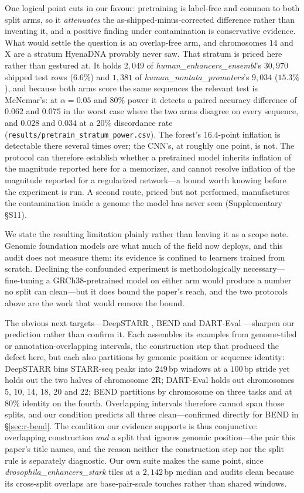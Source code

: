 \documentclass[webpdf,modern,large,namedate]{oup-authoring-template}%
\begin{document}
One logical point cuts in our favour: pretraining is label-free and common to both split arms, so it \emph{attenuates} the as-shipped-minus-corrected difference rather than inventing it, and a positive finding under contamination is conservative evidence. What would settle the question is an overlap-free arm, and chromosomes $14$ and X are a stratum HyenaDNA provably never saw. That stratum is priced here rather than gestured at. It holds $2{,}049$ of \textit{human\_enhancers\_ensembl}'s $30{,}970$ shipped test rows ($6.6\%$) and $1{,}381$ of \textit{human\_nontata\_promoters}'s $9{,}034$ ($15.3\%$), and because both arms score the same sequences the relevant test is McNemar's: at $\alpha=0.05$ and $80\%$ power it detects a paired accuracy difference of $0.062$ and $0.075$ in the worst case where the two arms disagree on every sequence, and $0.028$ and $0.034$ at a $20\%$ discordance rate (\texttt{results/pretrain\_stratum\_power.csv}). The forest's $16.4$-point inflation is detectable there several times over; the CNN's, at roughly one point, is not. The protocol can therefore establish whether a pretrained model inherits inflation of the magnitude reported here for a memorizer, and cannot resolve inflation of the magnitude reported for a regularized network---a bound worth knowing before the experiment is run. A second route, priced but not performed, manufactures the contamination inside a genome the model has never seen (Supplementary \S S11).

We state the resulting limitation plainly rather than leaving it as a scope note. Genomic foundation models are what much of the field now deploys, and this audit does not measure them: its evidence is confined to learners trained from scratch. Declining the confounded experiment is methodologically necessary---fine-tuning a GRCh38-pretrained model on either arm would produce a number no split can clean---but it does bound the paper's reach, and the two protocols above are the work that would remove the bound.

The obvious next targets---DeepSTARR \citep{dealmeida2022deepstarr}, BEND \citep{marin2024bend} and DART-Eval \citep{patel2024darteval}---sharpen our prediction rather than confirm it. Each assembles its examples from genome-tiled or annotation-overlapping intervals, the construction step that produced the defect here, but each also partitions by genomic position or sequence identity: DeepSTARR bins STARR-seq peaks into $249$\,bp windows at a $100$\,bp stride yet holds out the two halves of chromosome 2R; DART-Eval holds out chromosomes 5, 10, 14, 18, 20 and 22; BEND partitions by chromosome on three tasks and at $80\%$ identity on the fourth. Overlapping intervals therefore cannot span those splits, and our condition predicts all three clean---confirmed directly for BEND in \S\ref{sec:r-bend}. The condition our evidence supports is thus conjunctive: overlapping construction \emph{and} a split that ignores genomic position---the pair this paper's title names, and the reason neither the construction step nor the split rule is separately diagnostic. Our own suite makes the same point, since \textit{drosophila\_enhancers\_stark} tiles at a $2{,}142$\,bp median and audits clean because its cross-split overlaps are base-pair-scale touches rather than shared windows.
\end{document}
